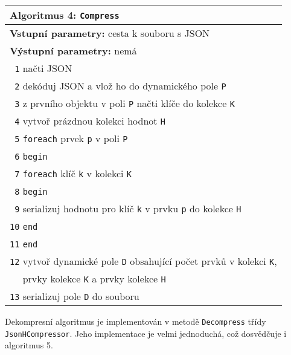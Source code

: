 \begin{table}[!h]
\centering
\begin{tabular}{|l|}
\hline
\textbf{Algoritmus 4:} \texttt{Compress}\\
\hline
\textbf{Vstupní parametry:} cesta k souboru s JSON\\
\textbf{Výstupní parametry:} nemá\\
\hline
\texttt{ 1} načti JSON\\
\texttt{ 2} dekóduj JSON a vlož ho do dynamického pole \texttt{P}\\
\texttt{ 3} z prvního objektu v poli \texttt{P} načti klíče do kolekce \texttt{K}\\
\texttt{ 4} vytvoř prázdnou kolekci hodnot \texttt{H}\\
\texttt{ 5} \texttt{foreach} prvek \texttt{p} v poli \texttt{P}\\
\texttt{ 6} \texttt{begin}\\
\texttt{ 7} \hspace*{5mm}\texttt{foreach} klíč \texttt{k} v kolekci \texttt{K}\\
\texttt{ 8} \hspace*{5mm}\texttt{begin}\\
\texttt{ 9} \hspace*{10mm}serializuj hodnotu pro klíč \texttt{k} v prvku \texttt{p} do kolekce \texttt{H}\\
\texttt{10} \hspace*{5mm}\texttt{end}\\
\texttt{11} \texttt{end}\\
\texttt{12} vytvoř dynamické pole \texttt{D} obsahující počet prvků v kolekci \texttt{K},\\
\verb+  + prvky kolekce \texttt{K} a prvky kolekce \texttt{H}\\
\texttt{13} serializuj pole \texttt{D} do souboru\\
\hline
\end{tabular}
\end{table}

Dekompresní algoritmus je implementován v metodě \texttt{Decompress} třídy \texttt{JsonHCompressor}. Jeho implementace je velmi jednoduchá, což dosvědčuje i algoritmus 5.

